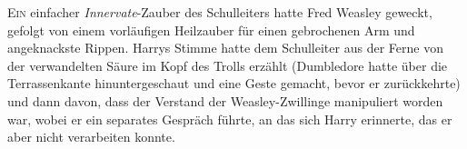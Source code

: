
\lettrine{E}{in} einfacher \emph{Innervate}-Zauber des Schulleiters hatte Fred Weasley geweckt, gefolgt von einem vorläufigen Heilzauber für einen gebrochenen Arm und angeknackste Rippen. Harrys Stimme hatte dem Schulleiter aus der Ferne von der verwandelten Säure im Kopf des Trolls erzählt (Dumbledore hatte über die Terrassenkante hinuntergeschaut und eine Geste gemacht, bevor er zurückkehrte) und dann davon, dass der Verstand der Weasley-Zwillinge manipuliert worden war, wobei er ein separates Gespräch führte, an das sich Harry erinnerte, das er aber nicht verarbeiten konnte.

